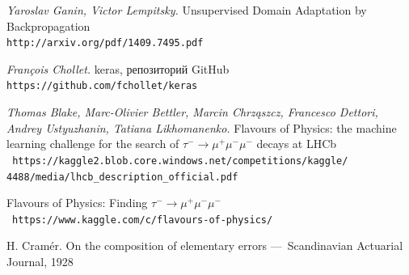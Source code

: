 \documentclass[14pt]{extarticle}
\begin{document}
\begin{thebibliography}{3}  

\textit{Yaroslav Ganin, Victor Lempitsky.} Unsupervised Domain Adaptation by Backpropagation \\ \texttt{http://arxiv.org/pdf/1409.7495.pdf}

\textit{François Chollet.} keras, репозиторий GitHub \\ \texttt{https://github.com/fchollet/keras}

\textit{Thomas Blake, Marc-Olivier Bettler, Marcin Chrząszcz, Francesco Dettori, Andrey Ustyuzhanin, Tatiana Likhomanenko.} Flavours of Physics: the machine learning challenge for the search of $\tau^-\rightarrow\mu^+ \mu^- \mu^-$ decays at LHCb \\ \texttt{
	https://kaggle2.blob.core.windows.net/competitions/kaggle/\\4488/media/lhcb\_description\_official.pdf
	}
	
 Flavours of Physics: Finding $\tau^-\rightarrow\mu^+ \mu^- \mu^-$ \\ \texttt{https://www.kaggle.com/c/flavours-of-physics/}

H. Cram\'er. On the composition of elementary errors — Scandinavian Actuarial Journal, 1928 %

\end{thebibliography}

\label{page:last}
\end{document}
